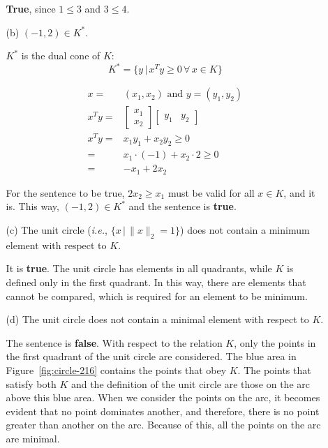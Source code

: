 \documentclass[11pt,a4paper]{article}
\begin{document}
\begin{itemize}
\begin{itemize}
        \textbf{True}, since $1 \leq 3$ and $3 \leq 4$.

        \item[(b)] $(-1,2) \in K^*$.
        
        $K^*$ is the dual cone of $K$:
        \begin{equation*}
            K^* = \{y \,\vert\, x^T y \geq 0 \,\forall\, x \in K\}
        \end{equation*}

        \begin{equation*}
            \begin{aligned}
                x = & (x_1, x_2) \text{ and } y = (y_1, y_2) \\
                x^T y = & \begin{bmatrix}
                    x_1 \\
                    x_2
                \end{bmatrix}
                \begin{bmatrix}
                    y_1 & y_2
                \end{bmatrix}\\
                x^T y = & x_1y_1 + x_2 y_2 \geq 0 \\
                = & x_1 \cdot (-1) + x_2 \cdot 2 \geq 0\\
                = & -x_1 + 2x_2
            \end{aligned}
        \end{equation*}

        For the sentence to be true, $2x_2 \geq x_1$ must be valid for all $x \in K$, and it is. This way, $(-1, 2) \in K^*$ and the sentence is \textbf{true}.

        \item[(c)] The unit circle (\textit{i.e.}, $\{x \, \vert \, \|x\|_2 = 1\}$) does not contain a minimum element with respect to $K$.
        
        It is \textbf{true}. The unit circle has elements in all quadrants, while $K$ is defined only in the first quadrant. In this way, there are elements that cannot be compared, which is required for an element to be minimum.

        \item[(d)] The unit circle does not contain a minimal element with respect to $K$.
        
        The sentence is \textbf{false}. With respect to the relation $K$, only the points in the first quadrant of the unit circle are considered. The blue area in Figure~\ref{fig:circle-216} contains the points that obey $K$. The points that satisfy both $K$ and the definition of the unit circle are those on the arc above this blue area. When we consider the points on the arc, it becomes evident that no point dominates another, and therefore, there is no point greater than another on the arc. Because of this, all the points on the arc are minimal.


\end{itemize}
\end{itemize}
\end{document}
